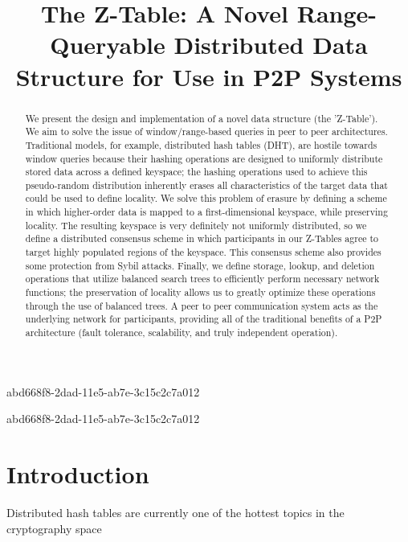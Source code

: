\documentclass[12pt]{article}
\title{The Z-Table: A Novel Range-Queryable Distributed Data Structure for Use in P2P Systems}
\begin{document}
\maketitle

abd668f8-2dad-11e5-ab7e-3c15c2c7a012\begin{abstract}
We present the design and implementation of a novel data structure (the 'Z-Table'). We aim to solve the issue of window/range-based queries in peer to peer architectures. Traditional models, for example,  distributed hash tables (DHT), are hostile towards window queries because their hashing operations are designed to uniformly distribute stored data across a defined keyspace; the hashing operations used to achieve this pseudo-random distribution inherently erases all characteristics of the target data that could be used to define locality. We solve this problem of erasure by defining a scheme in which higher-order data is mapped to a first-dimensional keyspace, while preserving locality. The resulting keyspace is very definitely not uniformly distributed, so we define a distributed consensus scheme in which participants in our Z-Tables agree to target highly populated regions of the keyspace. This consensus scheme also provides some protection from Sybil attacks. Finally, we define storage, lookup, and deletion operations that utilize balanced search trees to efficiently perform necessary network functions; the preservation of locality allows us to greatly optimize these operations through the use of balanced trees. A peer to peer communication system acts as the underlying network for participants, providing all of the traditional benefits of a P2P architecture (fault tolerance, scalability, and truly independent operation).
\end{abstract}
abd668f8-2dad-11e5-ab7e-3c15c2c7a012

\newpage
\section{Introduction}
Distributed hash tables are currently one of the hottest topics in the cryptography space~\cite{Stoica:2001dj,Rowstron:2001ea,Ratnasamy:2001wn}

\printbibliography
\end{document}
